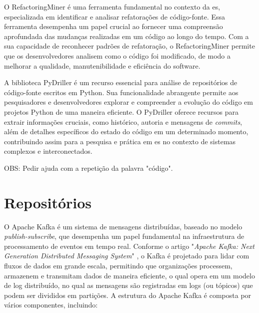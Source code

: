 O RefactoringMiner \cite{Tsantalis:ICSE:2018:RefactoringMiner} é uma ferramenta fundamental no contexto da \gls{es}, especializada em identificar e analisar refatorações de código-fonte. Essa ferramenta desempenha um papel crucial ao fornecer uma compreensão aprofundada das mudanças realizadas em um código ao longo do tempo. Com a sua capacidade de reconhecer padrões de refatoração, o RefactoringMiner permite que os desenvolvedores analisem como o código foi modificado, de modo a melhorar a qualidade, manutenibilidade e eficiência do software.

A biblioteca PyDriller \cite{PyDrillerSpadini2018} é um recurso essencial para análise de repositórios de código-fonte escritos em Python. Sua funcionalidade abrangente permite aos pesquisadores e desenvolvedores explorar e compreender a evolução do código em projetos Python de uma maneira eficiente. O PyDriller oferece recursos para extrair informações cruciais, como histórico, autoria e mensagens de \textit{commits}, além de detalhes específicos do estado do código em um determinado momento, contribuindo assim para a pesquisa e prática em \gls{es} no contexto de sistemas complexos e interconectados.

OBS: Pedir ajuda com a repetição da palavra "código".

\section{Repositórios}\label{sec:repositorios}
O Apache Kafka \cite{KafkaGitHub} é um sistema de mensagens distribuídas, baseado no modelo \textit{publish-subscribe}, que desempenha um papel fundamental na infraestrutura de processamento de eventos em tempo real. Conforme o artigo "\textit{Apache Kafka: Next Generation Distributed Messaging System}" \cite{ApacheKafkaNextGenerationDistributedMessagingSystem:2010}, o Kafka é projetado para lidar com fluxos de dados em grande escala, permitindo que organizações processem, armazenem e transmitam dados de maneira eficiente, o qual opera em um modelo de log distribuído, no qual as mensagens são registradas em logs (ou tópicos) que podem ser divididos em partições. 
A estrutura do Apache Kafka é composta por vários componentes, incluindo:

